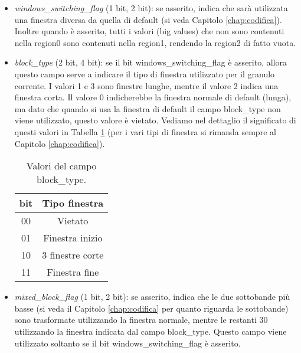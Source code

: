 \begin{itemize}
\begin{itemize}
						\item \textit{windows\_switching\_flag} (1 bit, 2 bit): se asserito, indica che sarà utilizzata una finestra diversa da quella di default (si veda Capitolo \ref{chap:codifica}). Inoltre quando è asserito, tutti i valori (big values) che non sono contenuti nella region0 sono contenuti nella region1, rendendo la region2 di fatto vuota.
						
						\item \textit{block\_type} (2 bit, 4 bit): se il bit windows\_switching\_flag è asserito, allora questo campo serve a indicare il tipo di finestra utilizzato per il granulo corrente. I valori 1 e 3 sono finestre lunghe, mentre il valore 2 indica una finestra corta. Il valore 0 indicherebbe la finestra normale di default (lunga), ma dato che quando si usa la finestra di default il campo block\_type non viene utilizzato, questo valore è vietato. Vediamo nel dettaglio il significato di questi valori in Tabella \ref{tab:campo_block_type} (per i vari tipi di finestra si rimanda sempre al Capitolo \ref{chap:codifica}).
						
							\begin{table}[h!]
								\centering
								\begin{tabular}{|c|c|}
									\multicolumn{1}{c}{\textbf{bit}} & \multicolumn{1}{c}{\textbf{Tipo finestra}}\\
									\hline
									00 & Vietato\\
									\hline
									01 & Finestra inizio\\
									\hline
									10 & 3 finestre corte\\
									\hline
									11 & Finestra fine\\
									\hline
								\end{tabular}
								\caption{Valori del campo block\_type.}
								\label{tab:campo_block_type}
							\end{table}
						
						\item \textit{mixed\_block\_flag} (1 bit, 2 bit): se asserito, indica che le due sottobande più basse (si veda il Capitolo \ref{chap:codifica} per quanto riguarda le sottobande) sono trasformate utilizzando la finestra normale, mentre le restanti 30 utilizzando la finestra indicata dal campo block\_type. Questo campo viene utilizzato soltanto se il bit windows\_switching\_flag è asserito.
						

\end{itemize}
\end{itemize}
